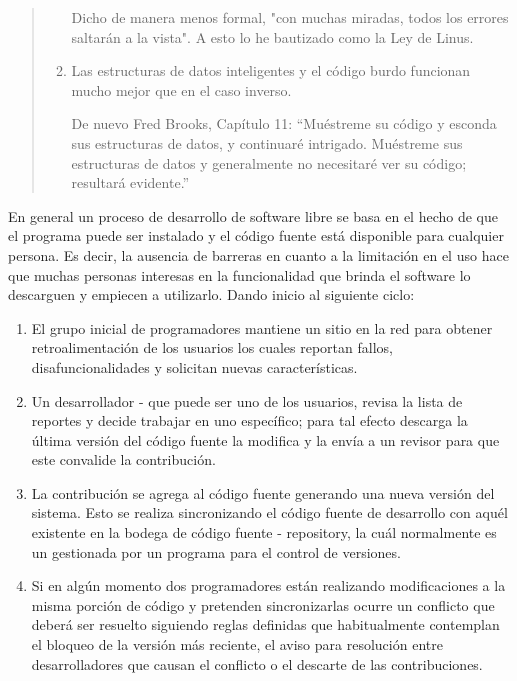 \begin{quote}
\begin{enumerate}
Dicho de manera menos formal, "con muchas miradas, todos los errores saltarán a la vista". A esto lo he bautizado como la Ley de Linus.

\item Las estructuras de datos inteligentes y el código burdo funcionan mucho mejor que en el caso inverso.

De nuevo Fred Brooks, Capítulo 11: “Muéstreme su código y esconda sus estructuras de datos, y continuaré intrigado. Muéstreme sus estructuras de datos y generalmente no necesitaré ver su código; resultará evidente.” 

\end{enumerate}
\end{quote} 
 
En general un proceso de desarrollo de software libre se basa en el hecho de que el programa puede ser instalado y el código fuente está disponible para cualquier persona. Es decir, la ausencia de barreras en cuanto a la limitación en el uso hace que muchas personas interesas en la funcionalidad que brinda el software lo descarguen y empiecen a utilizarlo. Dando inicio al siguiente ciclo:
\begin{enumerate}
\item El grupo inicial de programadores mantiene un sitio en la red para obtener retroalimentación de los usuarios los cuales reportan fallos, disafuncionalidades y solicitan nuevas características. 

\item Un desarrollador - que puede ser uno de los usuarios, revisa la lista de reportes y decide trabajar en uno específico; para tal efecto descarga la última versión del código fuente la modifica y la envía a un revisor para que este convalide la contribución.

\item La contribución se agrega al código fuente generando una nueva versión del sistema. Esto se realiza sincronizando el código fuente de desarrollo con aquél existente en la bodega de código fuente - repository, la cuál normalmente es un gestionada por un programa para el control de versiones. 

\item Si en algún momento dos programadores están realizando modificaciones a la misma porción de código y pretenden sincronizarlas ocurre un conflicto que deberá ser resuelto siguiendo reglas definidas que habitualmente contemplan el bloqueo de la versión más reciente, el aviso para resolución entre desarrolladores que causan el conflicto o el descarte de las contribuciones.
\end{enumerate}

